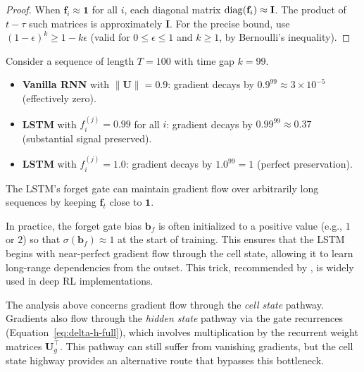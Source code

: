 \documentclass[11pt,a4paper]{article}
\begin{document}
\begin{proof}
When $\mathbf{f}_i \approx \mathbf{1}$ for all $i$, each diagonal
matrix $\operatorname{diag}(\mathbf{f}_i) \approx \mathbf{I}$.  The product of
$t - \tau$ such matrices is approximately $\mathbf{I}$.  For the
precise bound, use $(1-\epsilon)^k \geq 1 - k\epsilon$ (valid for
$0 \leq \epsilon \leq 1$ and $k \geq 1$, by Bernoulli's inequality).
\end{proof}

\begin{example}
\label{ex:gradient-comparison}
Consider a sequence of length $T = 100$ with time gap $k = 99$.
\begin{itemize}[nosep]
  \item \textbf{Vanilla RNN} with $\|\mathbf{U}\| = 0.9$: gradient
    decays by $0.9^{99} \approx 3 \times 10^{-5}$ (effectively zero).
  \item \textbf{LSTM} with $f_i^{(j)} = 0.99$ for all $i$:
    gradient decays by $0.99^{99} \approx 0.37$ (substantial
    signal preserved).
  \item \textbf{LSTM} with $f_i^{(j)} = 1.0$: gradient decays by
    $1.0^{99} = 1$ (perfect preservation).
\end{itemize}
The LSTM's forget gate can maintain gradient flow over arbitrarily
long sequences by keeping $\mathbf{f}_t$ close to $\mathbf{1}$.
\end{example}

\begin{rlconnection}[title={Forget Gate Bias Initialization}]
In practice, the forget gate bias $\mathbf{b}_f$ is often
initialized to a positive value (e.g., $1$ or $2$) so that
$\sigma(\mathbf{b}_f) \approx 1$ at the start of training.  This
ensures that the LSTM begins with near-perfect gradient flow through
the cell state, allowing it to learn long-range dependencies from
the outset.  This trick, recommended by \citet{gers2000}, is widely
used in deep RL implementations.
\end{rlconnection}

\begin{warning}[title={Gradient Flow Through Hidden State}]
The analysis above concerns gradient flow through the
\emph{cell state} pathway.  Gradients also flow through the
\emph{hidden state} pathway via the gate recurrences
(Equation~\ref{eq:delta-h-full}), which involves multiplication by
the recurrent weight matrices $\mathbf{U}_g^\top$.  This pathway
can still suffer from vanishing gradients, but the cell state
highway provides an alternative route that bypasses this bottleneck.
\end{warning}
\end{document}
